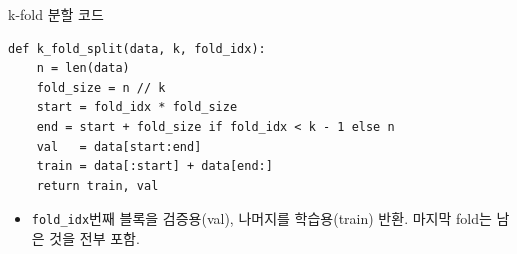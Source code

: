 \begin{frame}[fragile]{k-fold 분할 코드}
\begin{lstlisting}
def k_fold_split(data, k, fold_idx):
    n = len(data)
    fold_size = n // k
    start = fold_idx * fold_size
    end = start + fold_size if fold_idx < k - 1 else n
    val   = data[start:end]
    train = data[:start] + data[end:]
    return train, val
\end{lstlisting}
  \begin{itemize}
    \item \texttt{fold\_idx}번째 블록을 검증용(val), 나머지를 학습용(train)
      반환. 마지막 fold는 남은 것을 전부 포함.
    
  \end{itemize}
  

\end{frame}
